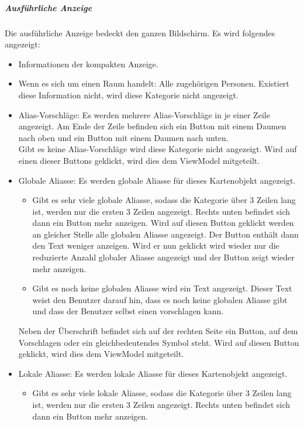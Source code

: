 \subparagraph*{Ausführliche Anzeige}
Die ausführliche Anzeige bedeckt den ganzen Bildschirm.
Es wird folgendes angezeigt:
\begin{itemize}
    \item Informationen der kompakten Anzeige.
    \item Wenn es sich um einen Raum handelt: Alle zugehörigen Personen. 
    Existiert diese Information nicht, wird diese Kategorie nicht angezeigt.
    \item Alias-Vorschläge: Es werden mehrere Alias-Vorschläge in je einer Zeile angezeigt. 
    Am Ende der Zeile befinden sich ein Button mit einem Daumen nach oben und ein Button mit einem Daumen nach unten.\\
    Gibt es keine Alias-Vorschläge wird diese Kategorie nicht angezeigt. 
    Wird auf einen dieser Buttons geklickt, wird dies dem ViewModel mitgeteilt.
    \item Globale Aliasse: Es werden globale Aliasse für dieses Kartenobjekt angezeigt.
    \begin{itemize}
        \item Gibt es sehr viele globale Aliasse, sodass die Kategorie über 3 Zeilen lang ist, werden nur 
        die ersten 3 Zeilen angezeigt. Rechts unten befindet sich dann ein Button \dq{}mehr anzeigen\dq{}. 
        Wird auf diesen Button geklickt werden an gleicher Stelle alle globalen Aliasse angezeigt. 
        Der Button enthält dann den Text \dq{}weniger anzeigen\dq{}. Wird er nun geklickt wird wieder nur die 
        reduzierte Anzahl globaler Aliasse angezeigt und der Button zeigt wieder \dq{}mehr anzeigen\dq{}.
        \item Gibt es noch keine globalen Aliasse wird ein Text angezeigt. Dieser Text weist den Benutzer 
        darauf hin, dass es noch keine globalen Aliasse gibt und dass der Benutzer selbst einen vorschlagen kann.
    \end{itemize}
    Neben der Überschrift befindet sich auf der rechten Seite ein Button, auf dem \dq{}Vorschlagen\dq{} oder ein gleichbedeutendes Symbol steht.
    Wird auf diesen Button geklickt, wird dies dem ViewModel mitgeteilt.
    \item Lokale Aliasse: Es werden lokale Aliasse für dieses Kartenobjekt angezeigt. 
    \begin{itemize}
        \item Gibt es sehr viele lokale Aliasse, sodass die Kategorie über 3 Zeilen lang ist, werden nur 
        die ersten 3 Zeilen angezeigt. Rechts unten befindet sich dann ein Button \dq{}mehr anzeigen\dq{}. 

\end{itemize}
\end{itemize}
